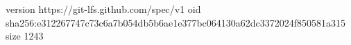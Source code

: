 version https://git-lfs.github.com/spec/v1
oid sha256:e312267747c73c6a7b054db5b6ae1e377bc064130a62dc3372024f850581a315
size 1243
